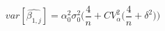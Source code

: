 \begin{equation}
var[\hat{\beta_{1,j}}] =\alpha_0^2\sigma_0^2\Big(\frac{4}{n} + CV_{\alpha}^2\Big(\frac{4}{n} + \delta^2\Big)\Big)
\end{equation}